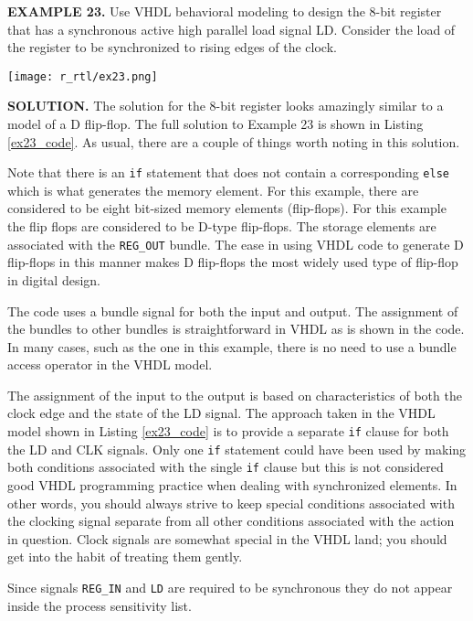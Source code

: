 \begin{leftbar}
\begin{minipage}[t]{0.52\textwidth}
\vspace{10pt}
\noindent
\textbf{EXAMPLE 23.}
Use VHDL behavioral modeling to design the 8-bit register that has a synchronous active high parallel load signal LD. Consider the load of the register to be synchronized to rising edges of the clock. 
\end{minipage}
\begin{minipage}[t]{0.47\textwidth}
\vspace{0pt}\raggedright
    \centering
	\texttt{[image: r\_rtl/ex23.png]}
\end{minipage}
\end{leftbar}
\noindent
\textbf{SOLUTION.} The solution for the 8-bit register looks amazingly similar to a model of a D flip-flop. The full solution to Example 23 is shown in Listing \ref{ex23_code}. As usual, there are a couple of things worth noting in this solution.
\begin{my_list}
\item Note that there is an \texttt{if} statement that does not contain a corresponding \texttt{else} which is what generates the memory element. For this example, there are considered to be eight bit-sized memory elements (flip-flops). For this example the flip flops are considered to be D-type flip-flops. The storage elements are associated with the \texttt{REG\_OUT} bundle. The ease in using VHDL code to generate D flip-flops in this manner makes D flip-flops the most widely used type of flip-flop in digital design.

\item The code uses a bundle signal for both the input and output. The assignment of the bundles to other bundles is straightforward in VHDL as is shown in the code. In many cases, such as the one in this example, there is no need to use a bundle access operator in the VHDL model. 

\item The assignment of the input to the output is based on characteristics of both the clock edge and the state of the LD signal. The approach taken in the VHDL model shown in Listing \ref{ex23_code} is to provide a separate \texttt{if} clause for both the LD and CLK signals. Only one \texttt{if} statement could have been used by making both conditions associated with the single \texttt{if} clause but this is not considered good VHDL programming practice when dealing with synchronized elements. In other words, you should always strive to keep special conditions associated with the clocking signal separate from all other conditions associated with the action in question. Clock signals are somewhat special in the VHDL land; you should get into the habit of treating them gently. 

\item Since signals \texttt{REG\_IN} and \texttt{LD} are required to be synchronous they do not appear inside the process sensitivity list.
\end{my_list}

